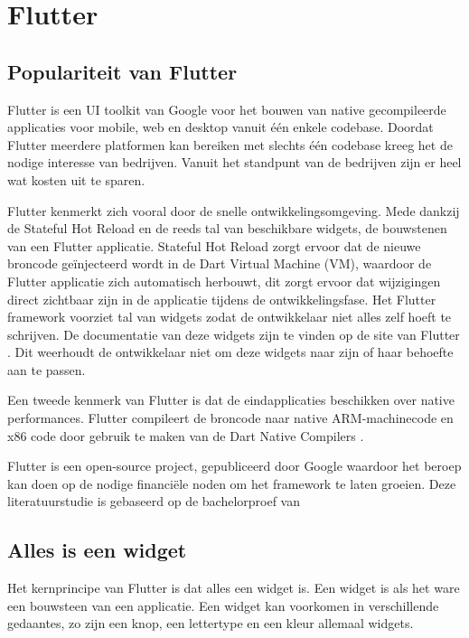\section{Flutter}
\subsection{Populariteit van Flutter}
Flutter is een UI toolkit van Google voor het bouwen van native gecompileerde applicaties voor mobile, web en desktop vanuit één enkele codebase. Doordat Flutter meerdere platformen kan bereiken met slechts één codebase kreeg het de nodige interesse van bedrijven. Vanuit het standpunt van de bedrijven zijn er heel wat kosten uit te sparen.

Flutter kenmerkt zich vooral door de snelle ontwikkelingsomgeving. Mede dankzij de Stateful Hot Reload en de reeds tal van beschikbare widgets, de bouwstenen van een Flutter applicatie. Stateful Hot Reload zorgt ervoor dat de nieuwe broncode geïnjecteerd wordt in de Dart Virtual Machine (VM), waardoor de Flutter applicatie zich automatisch herbouwt, dit zorgt ervoor dat wijzigingen direct zichtbaar zijn in de applicatie tijdens de ontwikkelingsfase. Het Flutter framework voorziet tal van widgets zodat de ontwikkelaar niet alles zelf hoeft te schrijven. De documentatie van deze widgets zijn te vinden op de site van Flutter \textcite{Flutter2019}. Dit weerhoudt de ontwikkelaar niet om deze widgets naar zijn of haar behoefte aan te passen.

Een tweede kenmerk van Flutter is dat de eindapplicaties beschikken over native performances. Flutter compileert de broncode naar native ARM-machinecode en x86 code door gebruik te maken van de Dart Native Compilers \autocite{Dart2019}.

Flutter is een open-source project, gepubliceerd door Google waardoor het beroep kan doen op de nodige financiële noden om het framework te laten groeien. 
Deze literatuurstudie is gebaseerd op de bachelorproef van \autocite{Coninck2019}

\subsection{Alles is een widget}
\label{ch:alles-is-een-widget}
Het kernprincipe van Flutter is dat alles een widget is. Een widget is als het ware een bouwsteen van een applicatie. Een widget kan voorkomen in verschillende gedaantes, zo zijn een knop, een lettertype en een kleur allemaal widgets. 

